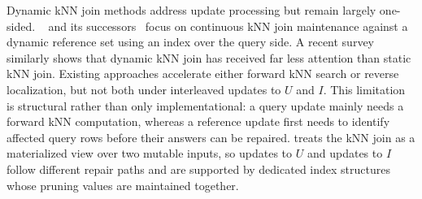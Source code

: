 Dynamic kNN join methods address update processing but remain largely one-sided. \hdrtree~\cite{yang2014continuous} and its successors~\cite{ukey2022efficient,ukey2023efficient,ukey2023knn} focus on continuous kNN join maintenance against a dynamic reference set using an index over the query side. A recent survey~\cite{ukey2023survey} similarly shows that dynamic kNN join has received far less attention than static kNN join. Existing approaches accelerate either forward kNN search or reverse localization, but not both under interleaved updates to $U$ and $I$. This limitation is structural rather than only implementational: a query update mainly needs a forward kNN computation, whereas a reference update first needs to identify affected query rows before their answers can be repaired. \dualtree treats the kNN join as a materialized view over two mutable inputs, so updates to $U$ and updates to $I$ follow different repair paths and are supported by dedicated index structures whose pruning values are maintained together.
